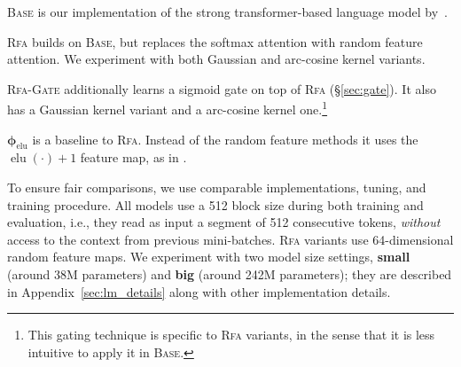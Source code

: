 \begin{compactitem}
\item \textsc{Base} is our implementation of the strong transformer-based language model by~\citet{baevski2018adaptive}. 
\item \textsc{Rfa} builds on \textsc{Base}, but replaces the softmax attention with random feature attention. We experiment with both Gaussian and arc-cosine kernel variants.
\item \textsc{Rfa-Gate} additionally learns a sigmoid gate on top of \textsc{Rfa} (\S\ref{sec:gate}). It also has a Gaussian kernel variant and a arc-cosine kernel one.\footnote{ 
This gating technique is specific to \textsc{Rfa} variants, in the sense that it is less intuitive to apply it in \textsc{Base}.}
\item $\boldsymbol{\phi}_{\operatorname{elu}}$ is a baseline to \textsc{Rfa}.
Instead of the random feature methods it uses the 
$\operatorname{elu}(\boldsymbol{\cdot}) + 1$ feature map, as in \citet{katharopoulos20transformers}. 
\end{compactitem}

To ensure fair comparisons, we use comparable implementations, tuning, and training procedure. All models use a 512 block size during both training and evaluation, i.e., they read as input a segment of 512 consecutive tokens, \emph{without}
access to the context from previous mini-batches. 
\textsc{Rfa} variants use 64-dimensional random feature maps. We experiment with two model size settings,
\textbf{small} (around 38M parameters) and \textbf{big} (around 242M parameters); they are described in Appendix~\ref{sec:lm_details}
along with other implementation details.

